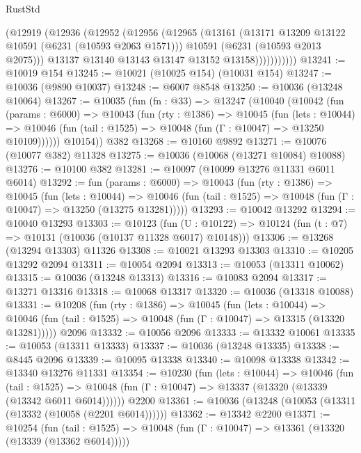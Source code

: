 \begin{lexlean}{RustStd}
\begin{coremodule}
{{                (@12919
                  (@12936
                    (@12952
                      (@12956
                        (@12965
                          (@13161
                            (@13171 @13209 @13122 @10591 (@6231 (@10593 @2063 @1571)))
                            @10591
                            (@6231 (@10593 @2013 @2075)))
                          @13137
                          @13140
                          @13143
                          @13147
                          @13152
                          @13158)))))))))))
@13241 := @10019 @154
@13245 := @10021 (@10025 @154) (@10031 @154)
@13247 := @10036 (@9890 @10037)
@13248 := @6007 @8548
@13250 := @10036 (@13248 @10064)
@13267 := @10035
    (fun (fn : @33) =>
    @13247
      (@10040
        (@10042
          (fun (params : @6000) =>
          @10043
            (fun (rty : @1386) =>
            @10045
              (fun (lets : @10044) =>
              @10046 (fun (tail : @1525) => @10048 (fun (Γ : @10047) => @13250 @10109))))))
        @10154))
    @382
@13268 := @10160 @9892
@13271 := @10076 (@10077 @382) @11328
@13275 := @10036 (@10068 (@13271 @10084) @10088)
@13276 := @10100 @382
@13281 := @10097 (@10099 @13276 @11331 @6011 @6014)
@13292 := fun (params : @6000) =>
  @10043
    (fun (rty : @1386) =>
    @10045
      (fun (lets : @10044) =>
      @10046 (fun (tail : @1525) => @10048 (fun (Γ : @10047) => @13250 (@13275 @13281)))))
@13293 := @10042 @13292
@13294 := @10040 @13293
@13303 := @10123
    (fun (U : @10122) => @10124 (fun (t : @7) => @10131 (@10036 (@10137 @11328 @6017) @10148)))
@13306 := @13268 (@13294 @13303) @11326
@13308 := @10021 @13293 @13303
@13310 := @10205 @13292 @2094
@13311 := @10054 @2094
@13313 := @10053 (@13311 @10062)
@13315 := @10036 (@13248 @13313)
@13316 := @10083 @2094
@13317 := @13271 @13316
@13318 := @10068 @13317
@13320 := @10036 (@13318 @10088)
@13331 := @10208
    (fun (rty : @1386) =>
    @10045
      (fun (lets : @10044) =>
      @10046 (fun (tail : @1525) => @10048 (fun (Γ : @10047) => @13315 (@13320 @13281)))))
    @2096
@13332 := @10056 @2096
@13333 := @13332 @10061
@13335 := @10053 (@13311 @13333)
@13337 := @10036 (@13248 @13335)
@13338 := @8445 @2096
@13339 := @10095 @13338
@13340 := @10098 @13338
@13342 := @13340 @13276 @11331
@13354 := @10230
    (fun (lets : @10044) =>
    @10046
      (fun (tail : @1525) =>
      @10048 (fun (Γ : @10047) => @13337 (@13320 (@13339 (@13342 @6011 @6014))))))
    @2200
@13361 := @10036 (@13248 (@10053 (@13311 (@13332 (@10058 (@2201 @6014))))))
@13362 := @13342 @2200
@13371 := @10254
    (fun (tail : @1525) => @10048 (fun (Γ : @10047) => @13361 (@13320 (@13339 (@13362 @6014)))))
}}
\end{coremodule}
\end{lexlean}
